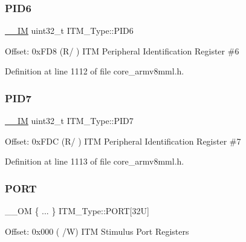 \mbox{\label{struct_i_t_m___type_ad34dbe6b1072c77d36281049c8b169f6}} 
\subsubsection{\texorpdfstring{P\+I\+D6}{PID6}}
{\footnotesize\ttfamily \hyperlink{core__sc300_8h_a4cc1649793116d7c2d8afce7a4ffce43}{\+\_\+\+\_\+\+IM} uint32\+\_\+t I\+T\+M\+\_\+\+Type\+::\+P\+I\+D6}

Offset\+: 0x\+F\+D8 (R/ ) I\+TM Peripheral Identification Register \#6 

Definition at line 1112 of file core\+\_\+armv8mml.\+h.

\mbox{\label{struct_i_t_m___type_a2bcec6803f28f30d5baf5e20e3517d3d}} 
\subsubsection{\texorpdfstring{P\+I\+D7}{PID7}}
{\footnotesize\ttfamily \hyperlink{core__sc300_8h_a4cc1649793116d7c2d8afce7a4ffce43}{\+\_\+\+\_\+\+IM} uint32\+\_\+t I\+T\+M\+\_\+\+Type\+::\+P\+I\+D7}

Offset\+: 0x\+F\+DC (R/ ) I\+TM Peripheral Identification Register \#7 

Definition at line 1113 of file core\+\_\+armv8mml.\+h.

\mbox{\label{struct_i_t_m___type_a826cda05b7aa0b6c6554793aba67d954}} 
\subsubsection{\texorpdfstring{P\+O\+RT}{PORT}\hspace{0.1cm}{\footnotesize\ttfamily [1/7]}}
{\footnotesize\ttfamily \+\_\+\+\_\+\+OM \{ ... \}    I\+T\+M\+\_\+\+Type\+::\+P\+O\+RT\mbox{[}32\+U\mbox{]}}

Offset\+: 0x000 ( /W) I\+TM Stimulus Port Registers \mbox{\label{struct_i_t_m___type_a2fc80b848dc9408836b15f1672b69ff6}} 
